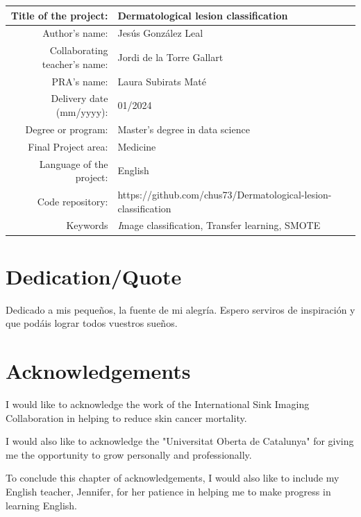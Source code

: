 \begin{table}[ht]
\centering{}
\renewcommand{\arraystretch}{2}
\begin{tabular}{r | l}
\hline
Title of the project: & Dermatological lesion classification\\
\hline
Author's name: & Jesús González Leal\\
\hline
Collaborating teacher's name: & Jordi de la Torre Gallart\\
\hline
PRA's name: & Laura Subirats Maté\\
\hline
Delivery date (mm/yyyy): & 01/2024\\
\hline
Degree or program: & Master’s degree in data science\\
\hline
Final Project area: & Medicine\\
\hline
Language of the project: & English\\
\hline
Code repository: & https://github.com/chus73/Dermatological-lesion-classification\\

\hline
Keywords & \textit Image classification, Transfer learning, SMOTE  \\
\hline
\end{tabular}
\end{table}

\chapter*{Dedication/Quote}

Dedicado a mis pequeños, la fuente de mi alegría. Espero serviros de inspiración y que podáis lograr todos vuestros sueños. 

\chapter*{Acknowledgements}


    I would like to acknowledge the work of the International Sink Imaging Collaboration \cite{isic_web} in helping to reduce skin cancer mortality. 

I would also like to acknowledge the "Universitat Oberta de Catalunya" for giving me the opportunity to grow personally and professionally.

To conclude this chapter of acknowledgements, I would also like to include my English teacher, Jennifer, for her patience in helping me to make progress in learning English.

